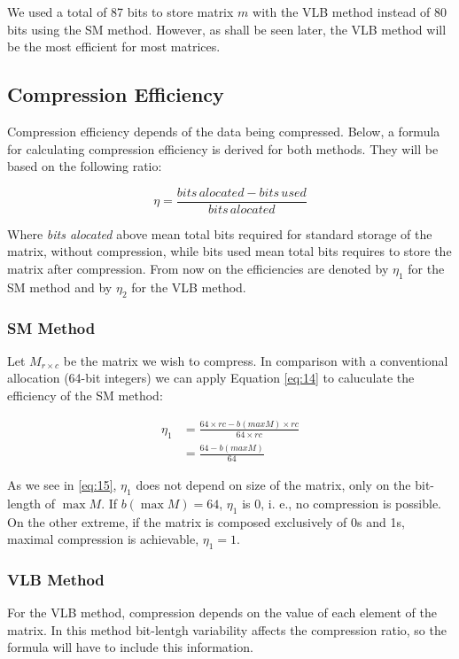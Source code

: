 \documentclass[10pt]{article}
\begin{document}
 We used a total of 87 bits to store matrix $m$ with the VLB method instead of 80 bits using the SM method. However, as shall be seen later, the VLB method will be the most efficient for most matrices.
 
 \subsection*{Compression Efficiency}
 Compression efficiency depends of the data being compressed. Below, a formula for calculating compression efficiency is derived for both methods. They will be based on the following ratio:
 
 \begin{equation}\label{eq:14}
  \eta=\frac{bits\, alocated-bits\, used}{bits\,alocated}
 \end{equation}
 
 Where \textit{bits alocated} above mean total bits required for standard storage of the matrix, without compression, while bits used mean total bits requires to store the matrix after compression. From now on the efficiencies are denoted by $\eta_1$ for the SM method and by $\eta_2$ for the VLB method. 
 \subsubsection*{SM Method}
 Let $M_{r \times c}$ be the matrix we wish to compress. In comparison with a conventional allocation (64-bit integers) we can apply Equation \ref{eq:14} to caluculate the efficiency of the SM method:

\begin{align}\label{eq:15}
 \eta_1 &= \frac{64 \times rc - b(max M) \times rc}{64 \times rc}\nonumber\\
 &= \frac{64  - b(max M) }{64}
\end{align}

As we see in \ref{eq:15}, $\eta_1$ does not depend on size of the matrix, only on the bit-length of $\max M$. If $b(\max M)=64$, $\eta_1$ is 0, i. e., no compression is possible. On the other extreme, if the matrix is composed exclusively of 0s and 1s, maximal compression is achievable, $\eta_1=1$.
 
 \subsubsection*{VLB Method}
 
 For the VLB method, compression depends on the value of each element of the matrix. In this method bit-lentgh variability affects the compression ratio, so the formula will have to include this information.
\end{document}
